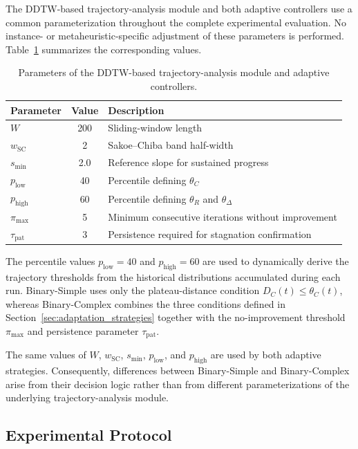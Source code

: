\documentclass[journal,article,submit,moreauthors]{Definitions/mdpi}
\begin{document}
The DDTW-based trajectory-analysis module and both adaptive controllers use
a common parameterization throughout the complete experimental evaluation.
No instance- or metaheuristic-specific adjustment of these parameters is
performed. Table~\ref{tab:dtw_params} summarizes the corresponding values.

\begin{table}[htbp]
\centering
\caption{Parameters of the DDTW-based trajectory-analysis module and adaptive
controllers.}
\label{tab:dtw_params}
\begin{tabular}{@{}l c l@{}}
\toprule
\textbf{Parameter} & \textbf{Value} & \textbf{Description} \\
\midrule
$W$                  & 200 & Sliding-window length \\
$w_{\mathrm{SC}}$    & 2   & Sakoe--Chiba band half-width \\
$s_{\min}$           & 2.0 & Reference slope for sustained progress \\
$p_{\mathrm{low}}$   & 40  & Percentile defining $\theta_C$ \\
$p_{\mathrm{high}}$  & 60  & Percentile defining $\theta_R$ and $\theta_\Delta$ \\
$\pi_{\max}$         & 5   & Minimum consecutive iterations without improvement \\
$\tau_{\mathrm{pat}}$ & 3  & Persistence required for stagnation confirmation \\
\bottomrule
\end{tabular}
\end{table}

The percentile values $p_{\mathrm{low}}=40$ and
$p_{\mathrm{high}}=60$ are used to dynamically derive the trajectory
thresholds from the historical distributions accumulated during each run.
Binary-Simple uses only the plateau-distance condition
$D_C(t)\leq\theta_C(t)$, whereas Binary-Complex combines the three conditions
defined in Section~\ref{sec:adaptation_strategies} together with the
no-improvement threshold $\pi_{\max}$ and persistence parameter
$\tau_{\mathrm{pat}}$.

The same values of $W$, $w_{\mathrm{SC}}$, $s_{\min}$,
$p_{\mathrm{low}}$, and $p_{\mathrm{high}}$ are used by both adaptive
strategies. Consequently, differences between Binary-Simple and
Binary-Complex arise from their decision logic rather than from different
parameterizations of the underlying trajectory-analysis module.


\subsection{Experimental Protocol}
\label{sec:protocol}
\end{document}
